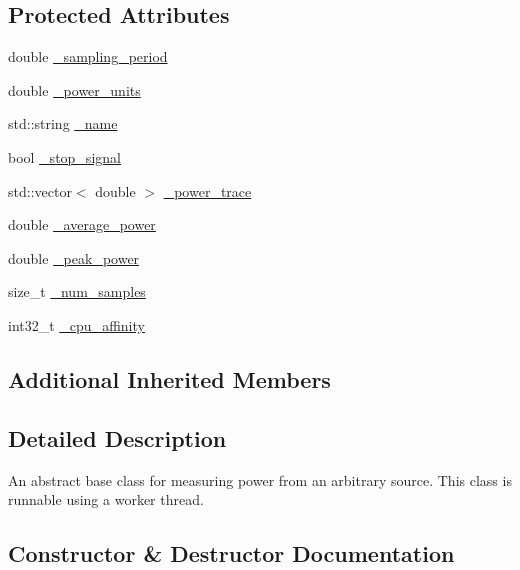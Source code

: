 \subsection*{Protected Attributes}
\begin{DoxyCompactItemize}
\item 
double \hyperlink{classxmem_1_1power_1_1_power_reader_a1c7d9b505d3c94347c43437a568e5948}{\+\_\+sampling\+\_\+period}
\item 
double \hyperlink{classxmem_1_1power_1_1_power_reader_a2835c933bd4807d6b3133a521dd76641}{\+\_\+power\+\_\+units}
\item 
std\+::string \hyperlink{classxmem_1_1power_1_1_power_reader_a85791da354d03c0a0f7ca4cf38b89e4c}{\+\_\+name}
\item 
bool \hyperlink{classxmem_1_1power_1_1_power_reader_a1c0c890279f3f2b7eb41ab3e5889bf2e}{\+\_\+stop\+\_\+signal}
\item 
std\+::vector$<$ double $>$ \hyperlink{classxmem_1_1power_1_1_power_reader_ac8ad4bada42912ece1cbb0769dbe3b4d}{\+\_\+power\+\_\+trace}
\item 
double \hyperlink{classxmem_1_1power_1_1_power_reader_a1ad637b79a21519c20f9dda64fc1b908}{\+\_\+average\+\_\+power}
\item 
double \hyperlink{classxmem_1_1power_1_1_power_reader_a0bfe4f56c143f3febb404d85558e45fa}{\+\_\+peak\+\_\+power}
\item 
size\+\_\+t \hyperlink{classxmem_1_1power_1_1_power_reader_a296a8d15083e01e33590cbcd836aa07b}{\+\_\+num\+\_\+samples}
\item 
int32\+\_\+t \hyperlink{classxmem_1_1power_1_1_power_reader_a0f95e6c4e8caa6db8de3fcf78509e887}{\+\_\+cpu\+\_\+affinity}
\end{DoxyCompactItemize}
\subsection*{Additional Inherited Members}


\subsection{Detailed Description}
An abstract base class for measuring power from an arbitrary source. This class is runnable using a worker thread. 

\subsection{Constructor \& Destructor Documentation}
\hypertarget{classxmem_1_1power_1_1_power_reader_abae158275e32689c1c69a90b8962959b}{}
